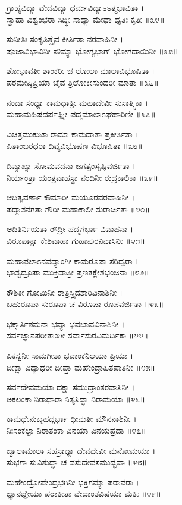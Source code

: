ಗ್ರಾಹ್ಯವಿದ್ಯಾ ವೇದವಿದ್ಯಾ ಧರ್ಮವಿದ್ಯಾಽಽತ್ಮಭಾವಿತಾ ।\\
ಸ್ವಾಹಾ ವಿಶ್ವಂಭರಾ ಸಿದ್ಧಿಃ ಸಾಧ್ಯಾ ಮೇಧಾ ಧೃತಿಃ ಕೃತಿಃ ॥೩೪॥

ಸುನೀತಿಃ ಸಂಕೃತಿಶ್ಚೈವ ಕೀರ್ತಿತಾ ನರವಾಹಿನೀ ।\\
ಪೂಜಾವಿಭಾವಿನೀ ಸೌಮ್ಯಾ ಭೋಗ್ಯಭಾಗ್ ಭೋಗದಾಯಿನೀ ॥೩೫॥

ಶೋಭಾವತೀ ಶಾಂಕರೀ ಚ ಲೋಲಾ ಮಾಲಾವಿಭೂಷಿತಾ ।\\
ಪರಮೇಷ್ಠಿಪ್ರಿಯಾ ಚೈವ ತ್ರಿಲೋಕೀಸುಂದರೀ ಮಾತಾ ॥೩೬॥

ನಂದಾ ಸಂಧ್ಯಾ ಕಾಮಧಾತ್ರೀ ಮಹಾದೇವೀ ಸುಸಾತ್ತ್ವಿಕಾ ।\\
ಮಹಾಮಹಿಷದರ್ಪಘ್ನೀ ಪದ್ಮಮಾಲಾಽಘಹಾರಿಣೀ ॥೩೭॥

ವಿಚಿತ್ರಮುಕುಟಾ ರಾಮಾ ಕಾಮದಾತಾ ಪ್ರಕೀರ್ತಿತಾ ।\\
ಪಿತಾಂಬರಧರಾ ದಿವ್ಯವಿಭೂಷಣ ವಿಭೂಷಿತಾ ॥೩೮॥

ದಿವ್ಯಾಖ್ಯಾ ಸೋಮವದನಾ ಜಗತ್ಸಂಸೃಷ್ಟಿವರ್ಜಿತಾ ।\\
ನಿರ್ಯಂತ್ರಾ ಯಂತ್ರವಾಹಸ್ಥಾ ನಂದಿನೀ ರುದ್ರಕಾಲಿಕಾ ॥೩೯॥

ಆದಿತ್ಯವರ್ಣಾ ಕೌಮಾರೀ ಮಯೂರವರವಾಹಿನೀ ।\\
ಪದ್ಮಾಸನಗತಾ ಗೌರೀ ಮಹಾಕಾಲೀ ಸುರಾರ್ಚಿತಾ ॥೪೦॥

ಅದಿತಿರ್ನಿಯತಾ ರೌದ್ರೀ ಪದ್ಮಗರ್ಭಾ ವಿವಾಹನಾ ।\\
ವಿರೂಪಾಕ್ಷಾ ಕೇಶಿವಾಹಾ ಗುಹಾಪುರನಿವಾಸಿನೀ ॥೪೧॥

ಮಹಾಫಲಾಽನವದ್ಯಾಂಗೀ ಕಾಮರೂಪಾ ಸರಿದ್ವರಾ ।\\
ಭಾಸ್ವದ್ರೂಪಾ ಮುಕ್ತಿದಾತ್ರೀ ಪ್ರಣತಕ್ಲೇಶಭಂಜನಾ ॥೪೨॥

ಕೌಶಿಕೀ ಗೋಮಿನೀ ರಾತ್ರಿಸ್ತ್ರಿದಶಾರಿವಿನಾಶಿನೀ ।\\
ಬಹುರೂಪಾ ಸುರೂಪಾ ಚ ವಿರೂಪಾ ರೂಪವರ್ಜಿತಾ ॥೪೩॥

ಭಕ್ತಾರ್ತಿಶಮನಾ ಭವ್ಯಾ ಭವಭಾವವಿನಾಶಿನೀ ।\\
ಸರ್ವಜ್ಞಾನಪರೀತಾಂಗೀ ಸರ್ವಾಸುರವಿಮರ್ದಿಕಾ ॥೪೪॥

ಪಿಕಸ್ವನೀ ಸಾಮಗೀತಾ ಭವಾಂಕನಿಲಯಾ ಪ್ರಿಯಾ ।\\
ದೀಕ್ಷಾ ವಿದ್ಯಾಧರೀ ದೀಪ್ತಾ ಮಹೇಂದ್ರಾಹಿತಪಾತಿನೀ ॥೪೫॥

ಸರ್ವದೇವಮಯಾ ದಕ್ಷಾ ಸಮುದ್ರಾಂತರವಾಸಿನೀ ।\\
ಅಕಲಂಕಾ ನಿರಾಧಾರಾ ನಿತ್ಯಸಿದ್ಧಾ ನಿರಾಮಯಾ ॥೪೬॥

ಕಾಮಧೇನುಬೃಹದ್ಗರ್ಭಾ ಧೀಮತೀ ಮೌನನಾಶಿನೀ ।\\
ನಿಃಸಂಕಲ್ಪಾ ನಿರಾತಂಕಾ ವಿನಯಾ ವಿನಯಪ್ರದಾ ॥೪೭॥

ಜ್ವಾಲಾಮಾಲಾ ಸಹಸ್ರಾಢ್ಯಾ ದೇವದೇವೀ ಮನೋಮಯಾ ।\\
ಸುಭಗಾ ಸುವಿಶುದ್ಧಾ ಚ ವಸುದೇವಸಮುದ್ಭವಾ ॥೪೮॥

ಮಹೇಂದ್ರೋಪೇಂದ್ರಭಗಿನೀ ಭಕ್ತಿಗಮ್ಯಾ ಪರಾವರಾ ।\\
ಜ್ಞಾನಜ್ಞೇಯಾ ಪರಾತೀತಾ ವೇದಾಂತವಿಷಯಾ ಮತಿಃ ॥೪೯॥

